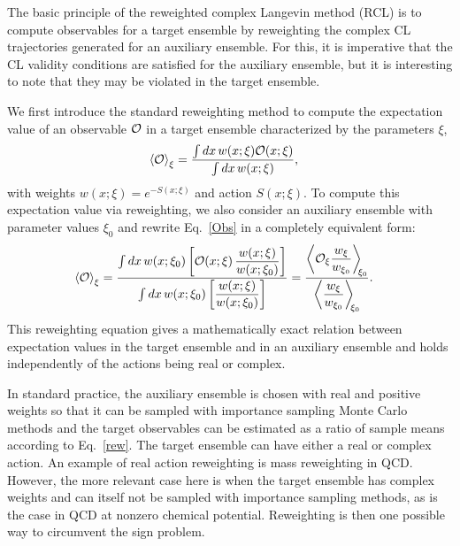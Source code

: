 \documentclass[prd,showpacs,reprint,nofootinbib,showkeys]{revtex4-1}
\newcommand{\Obs}{{\cal O}}
\begin{document}
The basic principle of the reweighted complex Langevin method (RCL) is to compute observables for a target ensemble by reweighting the complex CL trajectories generated for an auxiliary ensemble.
For this, it is imperative that the CL validity conditions are satisfied for the auxiliary ensemble, but it is interesting to note that they may be violated in the target ensemble.

We first introduce the standard reweighting method to compute the expectation value of an observable $\Obs$ in a target ensemble characterized by the parameters $\xi$,
\begin{align}
\braket{\Obs}_{\xi} &= \frac{\int dx \, w(x;\xi) \Obs(x;\xi)}{\int dx \, w(x;\xi)} ,
\label{Obs}
\end{align}
with weights $w(x;\xi)= e^{-S(x;\xi)}$ and action $S(x;\xi)$.
To compute this expectation value via reweighting, we also consider an auxiliary ensemble with parameter values $\xi_0$ and rewrite Eq.\ \eqref{Obs} in a completely equivalent form:
\begin{align}
\braket{\Obs}_{\xi} &= \frac{\int dx \, w(x;\xi_0) \left[\Obs(x;\xi)\,\dfrac{w(x;\xi)}{w(x;\xi_0)}\right]}{\int dx \,w(x;\xi_0) \left[\dfrac{w(x;\xi)}{w(x;\xi_0)}\right]}
= \frac{\Braket{\Obs_\xi \dfrac{w_\xi}{w_{\xi_0}}}_{\!\!\xi_0}}{\Braket{\dfrac{w_\xi}{w_{\xi_0}}}_{\!\!\xi_0}} .
\label{rew}
\end{align}
This reweighting equation gives a mathematically exact relation between expectation values in the target ensemble and in an auxiliary ensemble and holds independently of the actions being real or complex. 

In standard practice, the auxiliary ensemble is chosen with real and positive weights so that it can be sampled with importance sampling Monte Carlo methods and the target observables can be estimated as a ratio of sample means according to Eq.\ \eqref{rew}. The target ensemble can have either a real or complex action. An example of real action reweighting is mass reweighting in QCD. However, the more relevant case here is when the target ensemble has complex weights and can itself not be sampled with importance sampling methods, as is the case in QCD at nonzero chemical potential. Reweighting is then one possible way to circumvent the sign problem.
\end{document}
